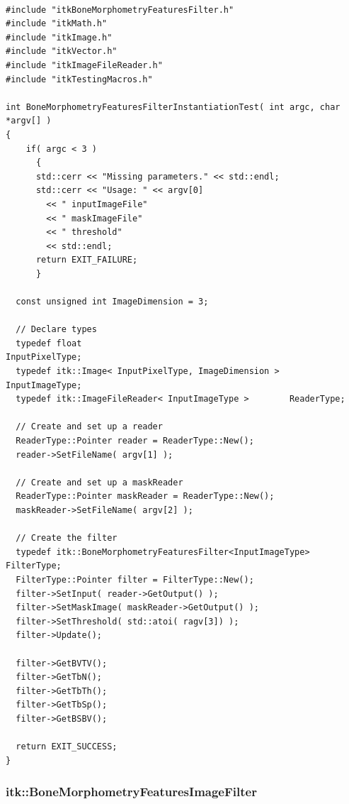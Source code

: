 \documentclass{InsightArticle}
\begin{document}
\begin{verbatim}

#include "itkBoneMorphometryFeaturesFilter.h"
#include "itkMath.h"
#include "itkImage.h"
#include "itkVector.h"
#include "itkImageFileReader.h"
#include "itkTestingMacros.h"

int BoneMorphometryFeaturesFilterInstantiationTest( int argc, char *argv[] )
{
    if( argc < 3 )
      {
      std::cerr << "Missing parameters." << std::endl;
      std::cerr << "Usage: " << argv[0]
        << " inputImageFile"
        << " maskImageFile"
        << " threshold"
        << std::endl;
      return EXIT_FAILURE;
      }

  const unsigned int ImageDimension = 3;

  // Declare types
  typedef float                                         InputPixelType;
  typedef itk::Image< InputPixelType, ImageDimension >  InputImageType;
  typedef itk::ImageFileReader< InputImageType >        ReaderType;

  // Create and set up a reader
  ReaderType::Pointer reader = ReaderType::New();
  reader->SetFileName( argv[1] );

  // Create and set up a maskReader
  ReaderType::Pointer maskReader = ReaderType::New();
  maskReader->SetFileName( argv[2] );

  // Create the filter
  typedef itk::BoneMorphometryFeaturesFilter<InputImageType> FilterType;
  FilterType::Pointer filter = FilterType::New();
  filter->SetInput( reader->GetOutput() );
  filter->SetMaskImage( maskReader->GetOutput() );
  filter->SetThreshold( std::atoi( ragv[3]) );
  filter->Update();

  filter->GetBVTV();
  filter->GetTbN();
  filter->GetTbTh();
  filter->GetTbSp();
  filter->GetBSBV();

  return EXIT_SUCCESS;
}

\end{verbatim}
\normalsize

\subsubsection{itk::BoneMorphometryFeaturesImageFilter}
\end{document}
